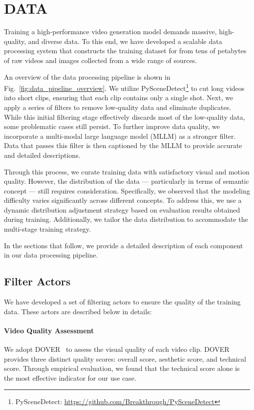 \section{DATA}
Training a high-performance video generation model demands massive, high-quality, and diverse data. To this end, we have developed a scalable data processing system that constructs the training dataset for \magi from tens of petabytes of raw videos and images collected from a wide range of sources.

An overview of the data processing pipeline is shown in Fig.~\ref{fig:data_pipeline_overview}. We utilize PySceneDetect\footnote{PySceneDetect: \url{https://github.com/Breakthrough/PySceneDetect}} to cut long videos into short clips, ensuring that each clip contains only a single shot. Next, we apply a series of filters to remove low-quality data and eliminate duplicates. While this initial filtering stage effectively discards most of the low-quality data, some problematic cases still persist. To further improve data quality, we incorporate a multi-modal large language model (MLLM) as a stronger filter. Data that passes this filter is then captioned by the MLLM to provide accurate and detailed descriptions.

Through this process, we curate training data with satisfactory visual and motion quality. However, the distribution of the data — particularly in terms of semantic concept — still requires consideration. Specifically, we observed that the modeling difficulty varies significantly across different concepts. To address this, we use a dynamic distribution adjustment strategy based on evaluation results obtained during training. Additionally, we tailor the data distribution to accommodate the multi-stage training strategy.

In the sections that follow, we provide a detailed description of each component in our data processing pipeline.




\subsection{Filter Actors}
We have developed a set of filtering actors to ensure the quality of the training data. These actors are described below in details:

\paragraph{Video Quality Assessment}
We adopt DOVER~\citep{wu2023exploring} to assess the visual quality of each video clip. DOVER provides three distinct quality scores: overall score, aesthetic score, and technical score. Through empirical evaluation, we found that the technical score alone is the most effective indicator for our use case.

